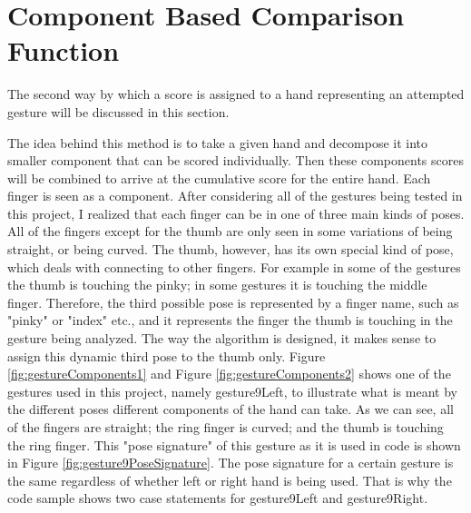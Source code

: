 	


\section{Component Based Comparison Function}
The second way by which a score is assigned to a hand representing an attempted gesture will be discussed in this section. 

The idea behind this method is to take a given hand and decompose it into smaller component that can be scored individually. Then these components scores will be combined to arrive at the cumulative score for the entire hand. Each finger is seen as a component. After considering all of the gestures being tested in this project, I realized that each finger can be in one of three main kinds of poses. All of the fingers except for the thumb are only seen in some variations of being straight, or being curved. The thumb, however, has its own special kind of pose, which deals with connecting to other fingers. For example in some of the gestures the thumb is touching the pinky; in some gestures it is touching the middle finger. Therefore, the third possible pose is represented by a finger name, such as "pinky" or "index" etc., and it represents the finger the thumb is touching in the gesture being analyzed. The way the algorithm is designed, it makes sense to assign this dynamic third pose to the thumb only. Figure \ref{fig:gestureComponents1} and Figure \ref{fig:gestureComponents2} shows one of the gestures used in this project, namely gesture9Left, to illustrate what is meant by the different poses different components of the hand can take. As we can see, all of the fingers are straight; the ring finger is curved; and the thumb is touching the ring finger. This "pose signature" of this gesture as it is used in code is shown in Figure \ref{fig:gesture9PoseSignature}. The pose signature for a certain gesture is the same regardless of whether left or right hand is being used. That is why the code sample shows two case statements for gesture9Left and gesture9Right. 

